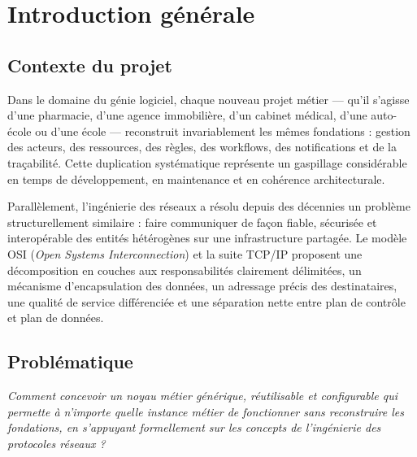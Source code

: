 \documentclass[12pt,a4paper]{report}
\theoremstyle{definition}
\theoremstyle{remark}
\newcommand{\osi}{\textsc{OSI}}
\begin{document}
\tableofcontents
\listoffigures
\listoftables

\chapter{Introduction générale}
\label{chap:intro}

\section{Contexte du projet}

Dans le domaine du génie logiciel, chaque nouveau projet métier — qu'il s'agisse d'une pharmacie, d'une agence immobilière, d'un cabinet médical, d'une auto-école ou d'une école — reconstruit invariablement les mêmes fondations : gestion des acteurs, des ressources, des règles, des workflows, des notifications et de la traçabilité. Cette duplication systématique représente un gaspillage considérable en temps de développement, en maintenance et en cohérence architecturale.

Parallèlement, l'ingénierie des réseaux a résolu depuis des décennies un problème structurellement similaire : faire communiquer de façon fiable, sécurisée et interopérable des entités hétérogènes sur une infrastructure partagée. Le modèle \osi{} (\textit{Open Systems Interconnection}) et la suite TCP/IP proposent une décomposition en couches aux responsabilités clairement délimitées, un mécanisme d'encapsulation des données, un adressage précis des destinataires, une qualité de service différenciée et une séparation nette entre plan de contrôle et plan de données.

\section{Problématique}

\begin{infobox}
	\textit{Comment concevoir un noyau métier générique, réutilisable et configurable qui permette à n'importe quelle instance métier de fonctionner sans reconstruire les fondations, en s'appuyant formellement sur les concepts de l'ingénierie des protocoles réseaux ?}
\end{infobox}
\end{document}
